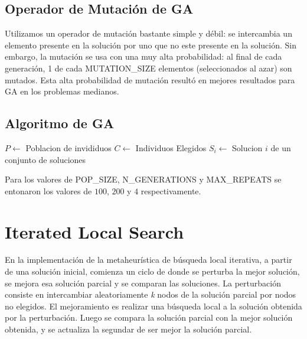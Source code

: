 \documentclass{ci5652}
\begin{document}
\subsection{Operador de Mutación de GA}
Utilizamos un operador de mutación bastante simple y débil: se intercambia un elemento presente en la solución por uno que no este presente en la solución. Sin embargo, la mutación se usa con una muy alta probabilidad: al final de cada generación, 1 de cada MUTATION\_SIZE elementos (seleccionados al azar) son mutados. Esta alta probabilidad de mutación resultó en mejores resultados para GA en los problemas medianos.

\subsection{Algoritmo de GA}
\begin{algorithm}
\DontPrintSemicolon
$P \leftarrow$ Poblacion de invididuos\;
$C \leftarrow$ Individuos Elegidos\;
$S_i \leftarrow$ Solucion $i$ de un conjunto de soluciones\;
\end{algorithm}

Para los valores de POP\_SIZE, N\_GENERATIONS y MAX\_REPEATS se entonaron los valores de $100$, $200$ y $4$ respectivamente.



\section{Iterated Local Search}
En la implementación de la metaheurística de búsqueda local iterativa, a partir de una solución inicial, comienza un ciclo de donde se perturba la mejor solución, se mejora esa solución parcial y se comparan las soluciones. La perturbación consiste en intercambiar aleatoriamente \textit{k} nodos de la solución parcial por nodos no elegidos. El mejoramiento es realizar una búsqueda local a la solución obtenida por la perturbación. Luego se compara la solución parcial con la mejor solución obtenida, y se actualiza la segundar de ser mejor la solución parcial.
\end{document}
